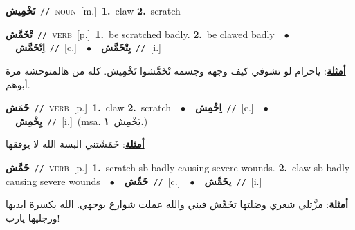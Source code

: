 \documentclass[10pt,a4paper,twoside]{article} %
\begin{document}
\begin{multicols}{2}
{\setlength\topsep{0pt}\textbf{\foreignlanguage{arabic}{تَخْمِيش}}\ {\color{gray}\texttt{//}\color{black}}\ \textsc{noun}\ [m.]\ \textbf{1.}~claw  \textbf{2.}~scratch\ } \vspace{2mm}

{\setlength\topsep{0pt}\textbf{\foreignlanguage{arabic}{تْخَمَّش}}\ {\color{gray}\texttt{//}\color{black}}\ \textsc{verb}\ [p.]\ \textbf{1.}~be scratched badly.  \textbf{2.}~be clawed badly\ \ $\bullet$\ \ \setlength\topsep{0pt}\textbf{\foreignlanguage{arabic}{اِتْخَمَّش}}\ {\color{gray}\texttt{//}\color{black}}\ [c.]\ \ $\bullet$\ \ \setlength\topsep{0pt}\textbf{\foreignlanguage{arabic}{يِتْخَمَّش}}\ {\color{gray}\texttt{//}\color{black}}\ [i.]\  \begin{flushright}\color{gray}\foreignlanguage{arabic}{\textbf{\underline{\foreignlanguage{arabic}{أمثلة}}}: ياحرام لو تشوفي كيف وجهه وجسمه تْخَمَّشوا تَخْمِيش. كله من هالمتوحشة مرة أبوهم.}\end{flushright}\color{black}} \vspace{2mm}

{\setlength\topsep{0pt}\textbf{\foreignlanguage{arabic}{خَمَش}}\ {\color{gray}\texttt{//}\color{black}}\ \textsc{verb}\ [p.]\ \textbf{1.}~claw  \textbf{2.}~scratch\ \ $\bullet$\ \ \setlength\topsep{0pt}\textbf{\foreignlanguage{arabic}{اِخْمِش}}\ {\color{gray}\texttt{//}\color{black}}\ [c.]\ \ $\bullet$\ \ \setlength\topsep{0pt}\textbf{\foreignlanguage{arabic}{يِخْمِش}}\ {\color{gray}\texttt{//}\color{black}}\ [i.]\ \color{gray}(msa. \foreignlanguage{arabic}{يَخْمِش}~\foreignlanguage{arabic}{\textbf{١.}})\color{black}\  \begin{flushright}\color{gray}\foreignlanguage{arabic}{\textbf{\underline{\foreignlanguage{arabic}{أمثلة}}}: خَمَشْتني البسة الله لا يوفقها}\end{flushright}\color{black}} \vspace{2mm}

{\setlength\topsep{0pt}\textbf{\foreignlanguage{arabic}{خَمَّش}}\ {\color{gray}\texttt{//}\color{black}}\ \textsc{verb}\ [p.]\ \textbf{1.}~scratch sb badly causing severe wounds.  \textbf{2.}~claw sb  badly causing severe wounds\ \ $\bullet$\ \ \setlength\topsep{0pt}\textbf{\foreignlanguage{arabic}{خَمِّش}}\ {\color{gray}\texttt{//}\color{black}}\ [c.]\ \ $\bullet$\ \ \setlength\topsep{0pt}\textbf{\foreignlanguage{arabic}{يخَمِّش}}\ {\color{gray}\texttt{//}\color{black}}\ [i.]\  \begin{flushright}\color{gray}\foreignlanguage{arabic}{\textbf{\underline{\foreignlanguage{arabic}{أمثلة}}}: مزَّتلي شعري وضلتها تخَمِّش فيني والله عملت شوارع بوجهي. الله يكسرة ايديها ورجليها يارب!}\end{flushright}\color{black}} \vspace{2mm}


\end{multicols}
\end{document}
